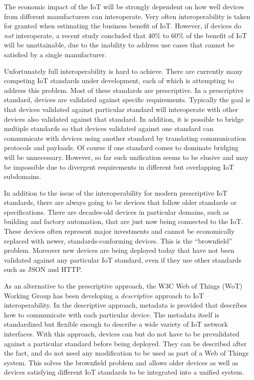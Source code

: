 The economic impact of the IoT will be strongly dependent on how well devices from 
different manufacturers can interoperate.
Very often interoperability is taken for granted when estimating the business
benefit of IoT. 
However, if devices do \emph{not} interoperate,
a recent study \cite{McK2015a} concluded that 40\% to 60\% of the 
benefit of IoT will be unattainable,
due to the inability to address use cases that cannot be satisfied by a single manufacturer.

Unfortunately full interoperability is hard to achieve.
There are currently many competing IoT standards under development,
each of which is attempting to address this problem.
Most of these standards are prescriptive.
In a prescriptive standard,
devices are validated against specific requirements.
Typically the goal is that devices validated against particular standard will interoperate with
other devices also validated against that standard.
In addition, it is possible to bridge multiple standards so that
devices validated against one standard can communicate with
devices using another standard by translating communication protocols and payloads.
Of course if one standard comes to dominate bridging will be unnecessary.
However, so far such unification seems to be elusive and may be impossible due to
divergent requirements in different but overlapping IoT subdomains.

In addition to the issue of the interoperability for modern prescriptive IoT standards, there are always going to be devices that follow older standards or specifications.
There are decades-old devices in particular domains, such as building and factory
automation, that are just now being connected to the IoT.
These devices often represent major investments and cannot be economically replaced with newer,
standards-conforming devices.
This is the ``brownfield'' problem.
Moreover new devices are being deployed today that have not been validated
against any particular IoT standard,
even if they use other standards such as JSON and HTTP.

As an alternative to the prescriptive approach,
the W3C Web of Things (WoT) Working Group has been developing a \emph{descriptive} 
approach to IoT interoperability.
In the descriptive approach,
metadata is provided that describes how to communicate with each particular device.
The metadata itself is standardized but flexible enough to describe a wide variety of
IoT network interfaces.
With this approach,
devices can but do not have to be prevalidated against 
a particular standard before being deployed.
They can be described after the fact,
and do not need any modification to be
used as part of a Web of Things system.
This solves the brownfield problem and allows
older devices as well as devices satisfying different IoT 
standards to be integrated into a unified system.  

